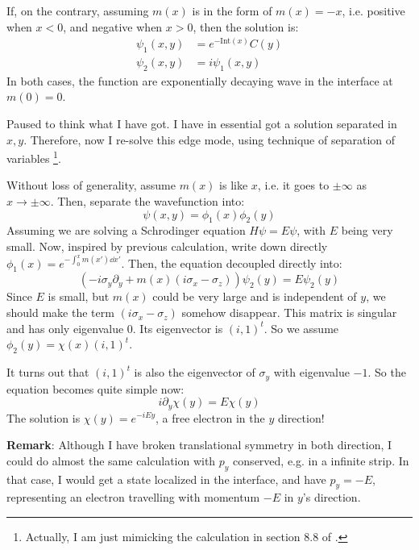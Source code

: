 \documentclass{article}
\begin{document}
    If, on the contrary, assuming $m(x)$ is in the form of $m(x)=-x$, i.e. positive when $x<0$, and negative when $x>0$, then the solution is:
    \begin{align}
        \psi_1 (x,y) &= e^{-\text{Int}(x)} C(y) \\
        \psi_2 (x,y) &= i \psi_1(x,y)
    \end{align}
    In both cases, the function are exponentially decaying wave in the
    interface at $m(0)=0$.

    Paused to think what I have got. I have in essential got a
    solution separated in $x,y$. Therefore, now I re-solve this edge
    mode, using technique of separation of variables 
    \footnote{Actually, I am just mimicking the calculation
    in section 8.8 of \cite{Bernevig2013}.}. 

    Without loss of generality, assume $m(x)$ is like $x$, i.e. it
    goes to $\pm\infty$ as $x\to\pm\infty$. Then, separate the
    wavefunction into:
    \begin{equation}
        \psi(x,y) = \phi_1(x)\phi_2(y)
    \end{equation}
    Assuming we are solving a Schrodinger equation $H\psi=E\psi$, with
    $E$ being very small.  Now, inspired by previous calculation,
    write down directly $\phi_1(x)=e^{-\int_0^x m(x')\dd{x'}}$.  Then,
    the equation decoupled directly into:
    \begin{equation}
        \left(
            -i\sigma_y\partial_y + m(x)\left(i\sigma_x-\sigma_z\right)
        \right)\psi_2(y) = E\psi_2(y)
    \end{equation}
    Since $E$ is small, but $m(x)$ could be very large and is
    independent of $y$, we should make the term $(i\sigma_x-\sigma_z)$
    somehow disappear. This matrix is singular and has only eigenvalue
    $0$. Its eigenvector is $(i,1)^t$. So we assume
    $\phi_2(y)=\chi(x)(i,1)^t$.
    
    It turns out that $(i,1)^t$ is also the eigenvector of
    $\sigma_y$ with eigenvalue $-1$. So the equation becomes quite
    simple now:
    \begin{equation}
        i\partial_y\chi(y) = E\chi(y)
    \end{equation}
    The solution is $\chi(y)=e^{-iEy}$, a free electron in the $y$
    direction!

    \textbf{Remark}: Although I have broken translational symmetry in
    both direction, I could do almost the same calculation with $p_y$
    conserved, e.g. in a infinite strip. In that case, I would get a
    state localized in the interface, and have $p_y=-E$, representing
    an electron travelling with momentum $-E$ in $y$'s direction.
\end{document}
